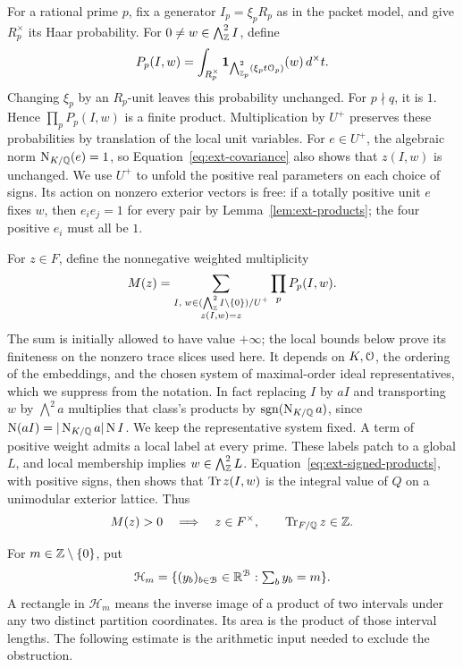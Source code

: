 For a rational prime \(p\), fix a generator \(I_p=\xi_pR_p\) as in the
packet model, and give \(R_p^\times\) its Haar probability.  For
\(0\ne w\in\bigwedge^2_{\mathbb Z}I\), define
\begin{equation}
 P_p(I,w)=\int_{R_p^\times}
 \mathbf1_{\bigwedge^2_{\mathbb Z_p}(\xi_p t\mathcal O_p)}(w)\,d^\times t .
 \label{eq:ext-label-probability}
\end{equation}
Changing \(\xi_p\) by an \(R_p\)-unit leaves this probability unchanged.
For \(p\nmid q\), it is \(1\).  Hence \(\prod_p P_p(I,w)\) is a finite
product.  Multiplication by \(U^+\) preserves these probabilities by
translation of the local unit variables.  For \(e\in U^+\), the algebraic
norm \(\operatorname{N}_{K/\mathbb Q}(e)=1\), so Equation~\eqref{eq:ext-covariance} also
shows that \(z(I,w)\) is unchanged.  We use \(U^+\) to unfold the positive
real parameters on each choice of signs.
Its action on nonzero exterior vectors is free: if a totally positive
unit \(e\) fixes \(w\), then \(e_i e_j=1\) for every pair by
Lemma~\ref{lem:ext-products}; the four positive \(e_i\) must all be \(1\).

For \(z\in F\), define the nonnegative weighted multiplicity
\begin{equation}
 M(z)=
 \sum_{\substack{I,\;
    w\in(\bigwedge^2_{\mathbb Z}I\setminus\{0\})/U^+\\
    z(I,w)=z}}
       \prod_p P_p(I,w).
 \label{eq:ext-multiplicity}
\end{equation}
The sum is initially allowed to have value \(+\infty\); the local bounds
below prove its finiteness on the nonzero trace slices used here.
It depends on \(K,\mathcal O\), the ordering of
the embeddings, and the chosen system of maximal-order ideal
representatives, which we suppress from the notation.  In fact replacing
\(I\) by \(aI\) and transporting \(w\) by \(\bigwedge^2a\) multiplies
that class's products by \(\operatorname{sgn}(\operatorname{N}_{K/\mathbb Q}a)\), since
\(\operatorname{N}(aI)=|\operatorname{N}_{K/\mathbb Q}a|\operatorname{N} I\).  We keep the representative system fixed.
A term of positive
weight admits a local label at every prime.  These labels patch to a
global \(L\), and local membership implies \(w\in\bigwedge^2_{\mathbb Z}L\).
Equation~\eqref{eq:ext-signed-products}, with positive signs, then shows
that \(\operatorname{Tr} z(I,w)\) is the integral value of \(Q\) on a unimodular
exterior lattice.  Thus
\begin{equation}
 M(z)>0\quad\Longrightarrow\quad
 z\in F^\times,\qquad \operatorname{Tr}_{F/\mathbb Q}z\in\mathbb Z.
 \label{eq:ext-trace-support}
\end{equation}

For \(m\in\mathbb Z\setminus\{0\}\), put
\[
 \mathcal H_m=\{(y_b)_{b\in\mathcal B}\in\mathbb R^{\mathcal B}:
                      \textstyle\sum_b y_b=m\}.
\]
A rectangle in \(\mathcal H_m\) means the inverse image of a product of
two intervals under any two distinct partition coordinates.  Its area
is the product of those interval lengths.  The following estimate is
the arithmetic input needed to exclude the obstruction.

